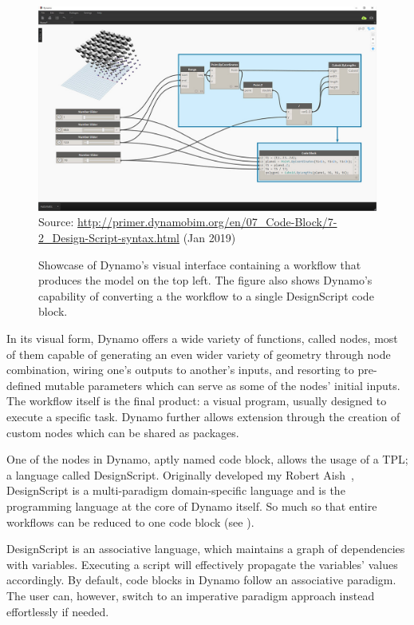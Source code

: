 \begin{figure}[htbp]
  \includegraphics[width=\textwidth]{fig/dynamo-node-to-code}
  {\scriptsize
  Source: \url{http://primer.dynamobim.org/en/07_Code-Block/7-2_Design-Script-syntax.html}
  (Jan 2019)
  }
  \caption[Dynamo's visual interface with node to code translation]{
    Showcase of Dynamo's visual interface containing a workflow that produces
    the model on the top left.  The figure also shows Dynamo's capability of
    converting a the workflow to a single DesignScript code block.}%
  \label{fig:related.ad.dynamo.node2code}
\end{figure}

In its visual form, Dynamo offers a wide variety of functions, called nodes,
most of them capable of generating an even wider variety of geometry through
node combination, wiring one's outputs to another's inputs, and resorting to
pre-defined mutable parameters which can serve as some of the nodes' initial
inputs.  The workflow itself is the final product: a visual program, usually
designed to execute a specific task.  Dynamo further allows extension through the
creation of custom nodes which can be shared as packages.

One of the nodes in Dynamo, aptly named code block, allows the usage of a
\ac{TPL}; a language called DesignScript.  Originally developed my Robert
Aish~\cite{Aish:2011:DesignScript}, DesignScript is a multi-paradigm
domain-specific language and is the programming language at the core of Dynamo
itself.  So much so that entire workflows can be reduced to one code block (see
).

DesignScript is an associative language, which maintains a graph of dependencies
with variables.  Executing a script will effectively propagate the variables'
values accordingly.  By default, code blocks in Dynamo follow an associative
paradigm.  The user can, however, switch to an imperative paradigm approach
instead effortlessly if needed.

